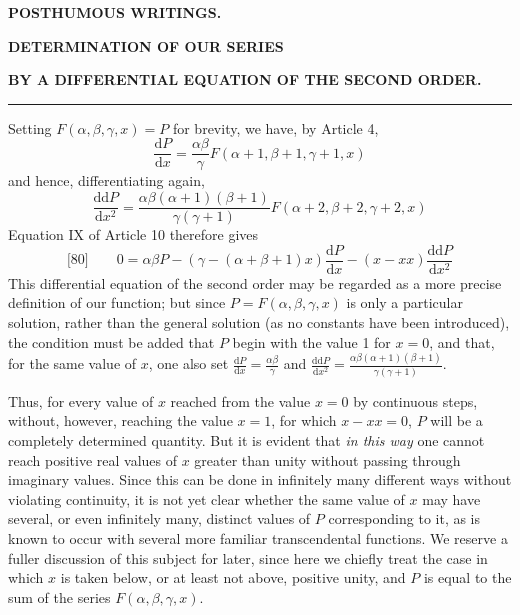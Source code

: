\clearpage{}
\begin{center}
\textbf{POSTHUMOUS WRITINGS.}\par\medskip
\textbf{DETERMINATION OF OUR SERIES}\par\medskip
\textbf{BY A DIFFERENTIAL EQUATION OF THE SECOND ORDER.}\par\medskip
\rule{0.08\linewidth}{0.3pt}\par\bigskip
\end{center}
Setting \(F(\alpha,\beta,\gamma,x)=P\) for brevity, we have, by Article 4,
\[
\frac{\mathrm{d}P}{\mathrm{d}x}=\frac{\alpha\beta}{\gamma}
F(\alpha+1,\beta+1,\gamma+1,x)
\]
and hence, differentiating again,
\[
\frac{\mathrm{dd}P}{\mathrm{d}x^2}
=\frac{\alpha\beta(\alpha+1)(\beta+1)}{\gamma(\gamma+1)}
F(\alpha+2,\beta+2,\gamma+2,x)
\]
Equation IX of Article 10 therefore gives
\[
\text{[80]}\qquad
0=\alpha\beta P-(\gamma-(\alpha+\beta+1)x)
\frac{\mathrm{d}P}{\mathrm{d}x}-(x-xx)\frac{\mathrm{dd}P}{\mathrm{d}x^2}
\]
This differential equation of the second order may be regarded as a more precise definition of our function; but since \(P=F(\alpha,\beta,\gamma,x)\) is only a particular solution, rather than the general solution (as no constants have been introduced), the condition must be added that \(P\) begin with the value 1 for \(x=0\), and that, for the same value of \(x\), one also set
\(\frac{\mathrm{d}P}{\mathrm{d}x}=\frac{\alpha\beta}{\gamma}\)
and
\(\frac{\mathrm{dd}P}{\mathrm{d}x^2}
=\frac{\alpha\beta(\alpha+1)(\beta+1)}{\gamma(\gamma+1)}\).

Thus, for every value of \(x\) reached from the value \(x=0\) by continuous steps, without, however, reaching the value \(x=1\), for which \(x-xx=0\), \(P\) will be a completely determined quantity. But it is evident that \emph{in this way} one cannot reach positive real values of \(x\) greater than unity without passing through imaginary values. Since this can be done in infinitely many different ways without violating continuity, it is not yet clear whether the same value of \(x\) may have several, or even infinitely many, distinct values of \(P\) corresponding to it, as is known to occur with several more familiar transcendental functions. We reserve a fuller discussion of this subject for later, since here we chiefly treat the case in which \(x\) is taken below, or at least not above, positive unity, and \(P\) is equal to the sum of the series \(F(\alpha,\beta,\gamma,x)\).

